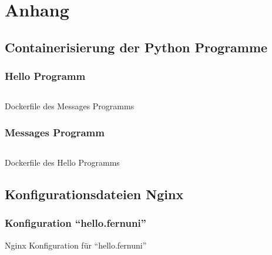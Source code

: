 \section{Anhang}

\subsection{Containerisierung der Python Programme}

\subsubsection{Hello Programm}
\begin{longlisting}    
\inputminted[fontfamily=tt,
linenos=true,
numberblanklines=true,
numbersep=5pt,
gobble=0,
frame=leftline,
framerule=0.4pt,
framesep=2mm,
funcnamehighlighting=true,
tabsize=4,
obeytabs=false,
mathescape=false
samepage=false, %
showspaces=false,
showtabs =false,
texcl=false,
breaklines=true]{docker}{code/docker/hello/Dockerfile}
\caption{Dockerfile des Messages Programms}
\end{longlisting}

\subsubsection{Messages Programm}
\begin{longlisting}
\inputminted[fontfamily=tt,
linenos=true,
numberblanklines=true,
numbersep=5pt,
gobble=0,
frame=leftline,
framerule=0.4pt,
framesep=2mm,
funcnamehighlighting=true,
tabsize=4,
obeytabs=false,
mathescape=false
samepage=false, %
showspaces=false,
showtabs =false,
texcl=false,
breaklines=true]{docker}{code/docker/messages/Dockerfile}
\caption{Dockerfile des Hello Programms}
\end{longlisting}
\subsection{Konfigurationsdateien Nginx}\label{kap:nginx}

\subsubsection{Konfiguration \enquote{hello.fernuni}}
\begin{longlisting}
    \caption{Nginx Konfiguration für \enquote{hello.fernuni}}
\end{longlisting}

